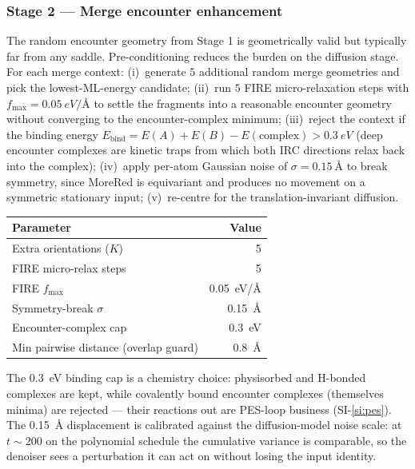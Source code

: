 \subsubsection{Stage 2 --- Merge encounter enhancement}
\label{sec:merge-prep}

The random encounter geometry from Stage 1 is geometrically valid but typically far from any saddle. Pre-conditioning reduces the burden on the diffusion stage. For each merge context: (i)~generate $5$ additional random merge geometries and pick the lowest-ML-energy candidate; (ii)~run $5$ FIRE micro-relaxation steps with $f_\text{max} = \SI{0.05}{eV/\angstrom}$ to settle the fragments into a reasonable encounter geometry without converging to the encounter-complex minimum; (iii)~reject the context if the binding energy $E_\text{bind} = E(A) + E(B) - E(\text{complex}) > \SI{0.3}{eV}$ (deep encounter complexes are kinetic traps from which both IRC directions relax back into the complex); (iv)~apply per-atom Gaussian noise of $\sigma = \SI{0.15}{\angstrom}$ to break symmetry, since MoreRed is equivariant and produces no movement on a symmetric stationary input; (v)~re-centre for the translation-invariant diffusion.

\noindent\begin{tabular}{lr}
\toprule
Parameter & Value \\
\midrule
Extra orientations ($K$) & 5 \\
FIRE micro-relax steps & 5 \\
FIRE $f_\text{max}$ & \SI{0.05}{eV/\angstrom} \\
Symmetry-break $\sigma$ & \SI{0.15}{\angstrom} \\
Encounter-complex cap & \SI{0.3}{eV} \\
Min pairwise distance (overlap guard) & \SI{0.8}{\angstrom} \\
\bottomrule
\end{tabular}

The \SI{0.3}{eV} binding cap is a chemistry choice: physisorbed and H-bonded complexes are kept, while covalently bound encounter complexes (themselves minima) are rejected --- their reactions out are PES-loop business (SI-\ref{si:pes}). The \SI{0.15}{\angstrom} displacement is calibrated against the diffusion-model noise scale: at $t \sim 200$ on the polynomial schedule the cumulative variance is comparable, so the denoiser sees a perturbation it can act on without losing the input identity.


